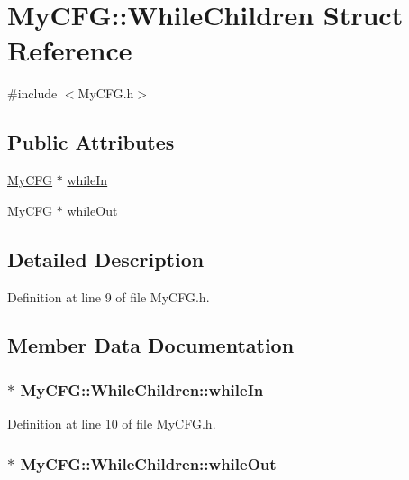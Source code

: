 \hypertarget{struct_my_c_f_g_1_1_while_children}{\section{My\-C\-F\-G\-:\-:While\-Children Struct Reference}
\label{struct_my_c_f_g_1_1_while_children}
}


{\ttfamily \#include $<$My\-C\-F\-G.\-h$>$}

\subsection*{Public Attributes}
\begin{DoxyCompactItemize}
\item 
\hyperlink{class_my_c_f_g}{My\-C\-F\-G} $\ast$ \hyperlink{struct_my_c_f_g_1_1_while_children_a3d69cf3e630c51ea93d6958605d512c0}{while\-In}
\item 
\hyperlink{class_my_c_f_g}{My\-C\-F\-G} $\ast$ \hyperlink{struct_my_c_f_g_1_1_while_children_a21cdbf44e5a7398d61f792821bdabf98}{while\-Out}
\end{DoxyCompactItemize}


\subsection{Detailed Description}


Definition at line 9 of file My\-C\-F\-G.\-h.



\subsection{Member Data Documentation}
\hypertarget{struct_my_c_f_g_1_1_while_children_a3d69cf3e630c51ea93d6958605d512c0}{
\subsubsection[{while\-In}]{$\ast$ My\-C\-F\-G\-::\-While\-Children\-::while\-In}}\label{struct_my_c_f_g_1_1_while_children_a3d69cf3e630c51ea93d6958605d512c0}


Definition at line 10 of file My\-C\-F\-G.\-h.

\hypertarget{struct_my_c_f_g_1_1_while_children_a21cdbf44e5a7398d61f792821bdabf98}{
\subsubsection[{while\-Out}]{$\ast$ My\-C\-F\-G\-::\-While\-Children\-::while\-Out}}\label{struct_my_c_f_g_1_1_while_children_a21cdbf44e5a7398d61f792821bdabf98}


